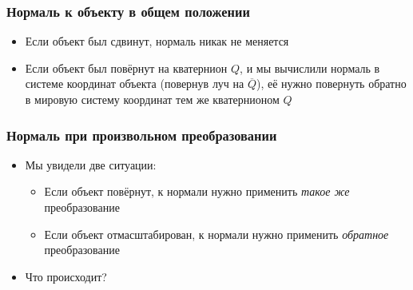\documentclass[10pt]{beamer}
\begin{document}
\begin{frame}[fragile]
\frametitle{Нормаль к объекту в общем положении}
\begin{itemize}
\item Если объект был сдвинут, нормаль никак не меняется
\pause
\item Если объект был повёрнут на кватернион \begin{math}Q\end{math}, и мы вычислили нормаль в системе координат объекта (повернув луч на \begin{math}\overline Q\end{math}), её нужно повернуть обратно в мировую систему координат тем же кватернионом \begin{math}Q\end{math}
\end{itemize}
\end{frame}

\begin{frame}[fragile]
\frametitle{Нормаль при произвольном преобразовании}
\begin{itemize}
\item Мы увидели две ситуации:
\pause
\begin{itemize}
\item Если объект повёрнут, к нормали нужно применить \textit{такое же} преобразование
\pause
\item Если объект отмасштабирован, к нормали нужно применить \textit{обратное} преобразование
\end{itemize}
\pause
\item Что происходит?
\end{itemize}
\end{frame}
\end{document}
